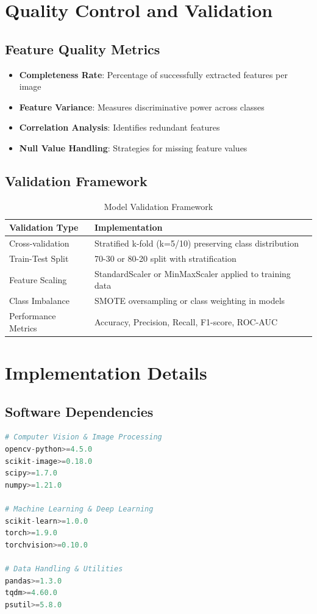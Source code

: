 \documentclass[11pt]{article}
\begin{document}
\section{Quality Control and Validation}

\subsection{Feature Quality Metrics}
\begin{itemize}
\item \textbf{Completeness Rate}: Percentage of successfully extracted features per image
\item \textbf{Feature Variance}: Measures discriminative power across classes
\item \textbf{Correlation Analysis}: Identifies redundant features
\item \textbf{Null Value Handling}: Strategies for missing feature values
\end{itemize}

\subsection{Validation Framework}
\begin{table}[h!]
\centering
\begin{tabular}{p{}p{}}
\toprule
\textbf{Validation Type} & \textbf{Implementation} \\
\midrule
Cross-validation & Stratified k-fold (k=5/10) preserving class distribution \\
Train-Test Split & 70-30 or 80-20 split with stratification \\
Feature Scaling & StandardScaler or MinMaxScaler applied to training data \\
Class Imbalance & SMOTE oversampling or class weighting in models \\
Performance Metrics & Accuracy, Precision, Recall, F1-score, ROC-AUC \\
\bottomrule
\end{tabular}
\caption{Model Validation Framework}
\end{table}

\section{Implementation Details}

\subsection{Software Dependencies}
\begin{lstlisting}[language=Python, caption=Core Dependencies]
# Computer Vision & Image Processing
opencv-python>=4.5.0
scikit-image>=0.18.0
scipy>=1.7.0
numpy>=1.21.0

# Machine Learning & Deep Learning
scikit-learn>=1.0.0
torch>=1.9.0
torchvision>=0.10.0

# Data Handling & Utilities
pandas>=1.3.0
tqdm>=4.60.0
psutil>=5.8.0
\end{lstlisting}
\end{document}
